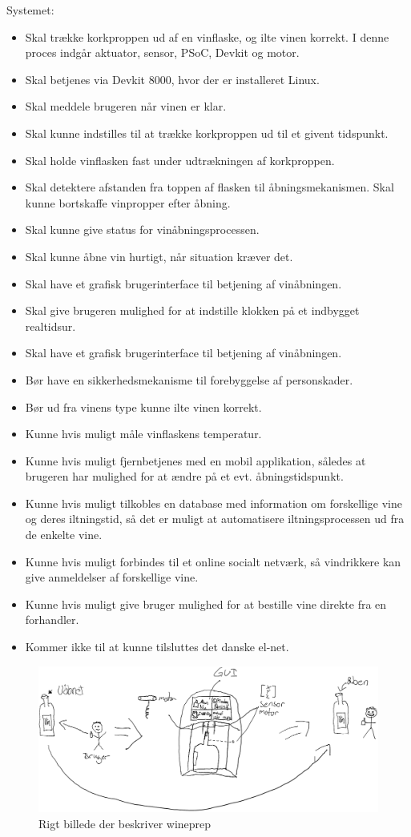 Systemet: \begin{itemize}
	\item Skal trække korkproppen ud af en vinflaske, og ilte vinen korrekt. I denne proces indgår aktuator, sensor, PSoC, Devkit og motor.
	\item Skal betjenes via Devkit 8000, hvor der er installeret Linux.
	\item Skal meddele brugeren når vinen er klar.
	\item Skal kunne indstilles til at trække korkproppen ud til et givent tidspunkt.
	\item Skal holde vinflasken fast under udtrækningen af korkproppen.
	\item Skal detektere afstanden fra toppen af flasken til åbningsmekanismen.
	Skal kunne bortskaffe vinpropper efter åbning.
	\item Skal kunne give status for vinåbningsprocessen.
	\item Skal kunne åbne vin hurtigt, når situation kræver det.
	\item Skal have et grafisk brugerinterface til betjening af vinåbningen.
	\item Skal give brugeren mulighed for at indstille klokken på et indbygget realtidsur.
	\item Skal have et grafisk brugerinterface til betjening af vinåbningen.
	\item Bør have en sikkerhedsmekanisme til forebyggelse af personskader.
	\item Bør ud fra vinens type kunne ilte vinen korrekt.
	\item Kunne hvis muligt måle vinflaskens temperatur.
	\item Kunne hvis muligt fjernbetjenes med en mobil applikation, således at brugeren har mulighed for at ændre på et evt. åbningstidspunkt.
	\item Kunne hvis muligt tilkobles en database med information om forskellige vine og deres iltningstid, så det er muligt at automatisere iltningsprocessen ud fra de enkelte vine.
	\item Kunne hvis muligt forbindes til et online socialt netværk, så vindrikkere kan give anmeldelser af forskellige vine.
	\item Kunne hvis muligt give bruger mulighed for at bestille vine direkte fra en forhandler.
	\item Kommer ikke til at kunne tilsluttes det danske el-net.
\end{itemize}

\begin{figure}[H]
	\caption{Rigt billede der beskriver wineprep}
	\label{RIGTBILLEDE}
	\includegraphics[scale=0.6]{WinePrep_realistisk.png}
\end{figure}
